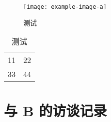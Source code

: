 \begin{figure}[htbp]
  \centering
  \texttt{[image: example-image-a]}
  \caption{测试}
  \label{figure:test3}
\end{figure}

\begin{table}[htbp]
  \centering
  \caption{测试}
  \label{table:test3}
  \begin{tabular}{|c|c|}
    11 & 22 \\
    33 & 44 
  \end{tabular}
\end{table}

\section{与 B 的访谈记录}
